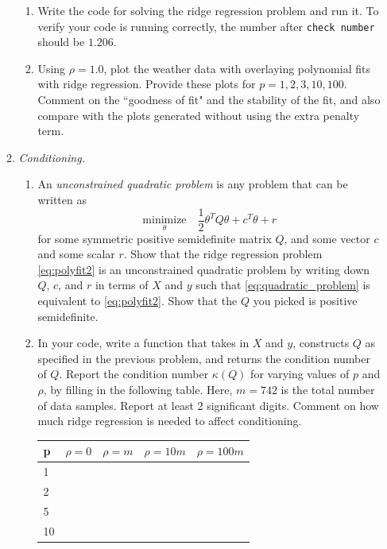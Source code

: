 \documentclass{article}
\newcommand{\minimize}[1]{\underset{#1}{\text{minimize}}}
\begin{document}
\begin{enumerate}
\begin{enumerate}
\begin{enumerate}
\item Write the code for solving the ridge regression problem and run it. To verify your code is running correctly, the number after \texttt{check number} should be   $1.206$.

\item  Using $\rho = 1.0$,  plot the weather data with overlaying polynomial fits with ridge regression. Provide these plots for $p = 1,2,3,10,100$. Comment on the ``goodness of fit" and the stability of the fit, and also compare with the plots generated without using the extra penalty term. 


\end{enumerate}

\item \emph{Conditioning.}
\begin{enumerate}
\item An \emph{unconstrained quadratic problem} is any problem that can be written as
\begin{equation}
\minimize{\theta}\quad \frac{1}{2}\theta^TQ\theta + c^T\theta + r
\label{eq:quadratic_problem}
\end{equation}
for some symmetric positive semidefinite matrix $Q$, and some vector $c$ and some scalar $r$. Show that the ridge regression problem \eqref{eq:polyfit2} is an unconstrained quadratic problem by writing down $Q$, $c$, and $r$ in terms of $X$ and $y$ such that
\eqref{eq:quadratic_problem} is equivalent to \eqref{eq:polyfit2}. Show that the $Q$ you picked is positive semidefinite. 


\item In your code, write a function that takes in $X$ and $y$, constructs $Q$ as specified in the previous problem, and  returns the condition number of $Q$. Report the condition number $\kappa(Q)$ for varying values of $p$ and $\rho$, by filling in the following table. 
Here, $m = 742$ is the total number of data samples. Report at least 2 significant digits.
Comment on how much ridge regression is needed to affect conditioning.

\begin{center}
\begin{tabular}{|l||l|l|l|l|}\hline
p& $\rho = 0$   & $\rho = m$   &$\rho = 10m$   &$\rho = 100m$\\ 
\hline\hline
1&  &&&\\
\hline
2&  &&&\\\hline
5&  &&&\\\hline
10& &&&\\\hline
\end{tabular}
\end{center}







\end{enumerate}
\end{enumerate}
\end{enumerate}
\end{document}
